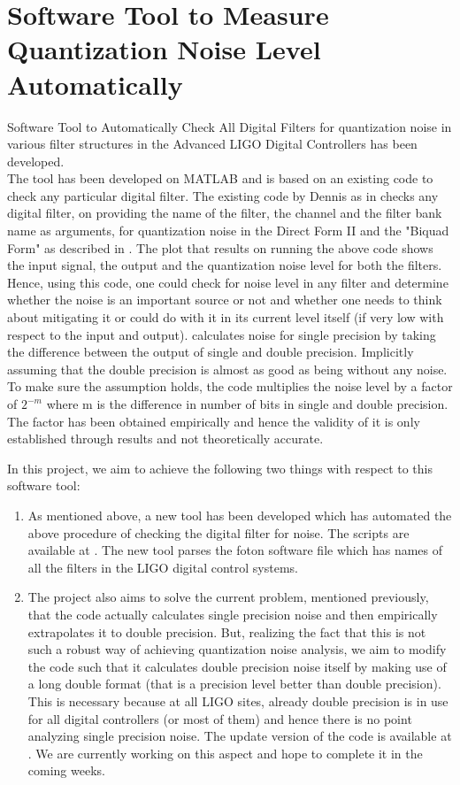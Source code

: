 \documentclass[colorlinks=true,pdfstartview=FitV,linkcolor=blue,
            citecolor=red,urlcolor=magenta]{ligodoc}
\begin{document}
\section{Software Tool to Measure Quantization Noise Level Automatically}
Software Tool to Automatically Check All Digital Filters for quantization noise in various filter structures in the Advanced LIGO Digital Controllers has been developed.\\
The tool has been developed on MATLAB and is based on an existing code to check any particular digital filter. The existing code by Dennis as in \cite{Den} checks any digital filter, on providing the name of the filter, the channel and the filter bank name as arguments, for quantization noise in the Direct Form II and the "Biquad Form" as described in \cite{Matts}. The plot that results on running the above code shows the input signal, the output and the quantization noise level for both the filters. Hence, using this code, one could check for noise level in any filter and determine whether the noise is an important source or not and whether one needs to think about mitigating it or could do with it in its current level itself (if very low with respect to the input and output).
\cite{Den} calculates noise for single precision by taking the difference between the output of single and double precision. Implicitly assuming that the double precision is almost as good as being without any noise. To make sure the assumption holds, the code multiplies the noise level by a factor of $2^{-m}$ where m is the difference in number of bits in single and double precision. The factor has been obtained empirically and hence the validity of it is only established through results and not theoretically accurate.

In this project, we aim to achieve the following two things with respect to this software tool:
\begin{enumerate}
\item As mentioned above, a new tool has been developed which has automated the above procedure of checking the digital filter for noise. The scripts are available at \cite{MyGit}. The new tool parses the foton software file which has names of all the filters in the LIGO digital control systems.

\item The project also aims to solve the current problem, mentioned previously, that the code actually calculates single precision noise and then empirically extrapolates it to double precision. But, realizing the fact that this is not such a robust way of achieving quantization noise analysis, we aim to modify the code such that it calculates double precision noise itself by making use of a long double format (that is a precision level better than double precision). This is necessary because at all LIGO sites, already double precision is in use for all digital controllers (or most of them) and hence there is no point analyzing single precision noise. The update version of the code is available at \cite{MyGit}. We are currently working on this aspect and hope to complete it in the coming weeks.
\end{enumerate}
\end{document}
